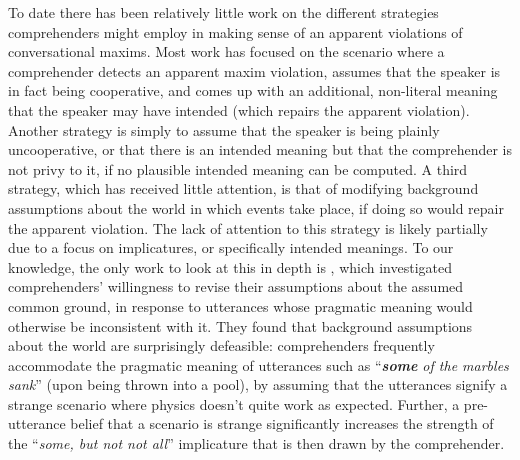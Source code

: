 To date there has been relatively little work on the different
strategies comprehenders might employ in making sense of an apparent
violations of conversational maxims. Most work has focused on the
scenario where a comprehender detects an apparent maxim violation,
assumes that the speaker is in fact being cooperative, and comes up with
an additional, non-literal meaning that the speaker may have intended
(which repairs the apparent violation). Another strategy is simply to
assume that the speaker is being plainly uncooperative, or that there is
an intended meaning but that the comprehender is not privy to it, if no
plausible intended meaning can be computed. A third strategy, which has
received little attention, is that of modifying background assumptions
about the world in which events take place, if doing so would repair the
apparent violation. The lack of attention to this strategy is likely
partially due to a focus on implicatures, or specifically intended
meanings. To our knowledge, the only work to look at this in depth is
\citet{Degen2015a}, which investigated comprehenders'
willingness to revise their assumptions about the assumed common ground,
in response to utterances whose pragmatic meaning would otherwise be
inconsistent with it. They found that background assumptions about the
world are surprisingly defeasible: comprehenders frequently accommodate
the pragmatic meaning of utterances such as \enquote{\emph{\textbf{some}
of the marbles sank}} (upon being thrown into a pool), by assuming that
the utterances signify a strange scenario where physics doesn't quite
work as expected. Further, a pre-utterance belief that a scenario is
strange significantly increases the strength of the \enquote{\emph{some,
but not not all}} implicature that is then drawn by the comprehender.

